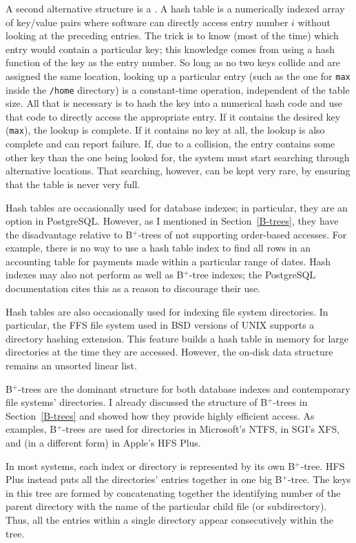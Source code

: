 A second alternative structure is a .  A hash table is a
numerically indexed array of key/value pairs where software can directly
access entry number $i$ without looking at the preceding entries.  The
trick is to know (most of the time) which entry would contain a
particular key; this knowledge comes from using a hash function of the key as the entry
number.  So long as no two keys collide and are assigned the same
location, looking up a particular entry (such as the one
for \verb|max| inside the
\verb|/home| directory) is a constant-time operation,
independent of the table size. All that is necessary is to hash the
key into a numerical hash code and use that code to directly access
the appropriate entry.  If it contains the desired key (\verb|max|),
the lookup is complete.  If it contains no key at all, the lookup is
also complete and can report failure.  If, due to a collision, the
entry contains some other key than the one being looked for, the
system must start searching through alternative locations.  That
searching, however, can be kept very rare, by ensuring that the table
is never very full.

Hash tables are occasionally used for database indexes; in particular,
they are an option in PostgreSQL.  However, as I mentioned in Section~\ref{B-trees},
they have the disadvantage relative to B${}^+$-trees of not supporting
order-based accesses.  For example, there is no way to use a hash
table index to find all rows in an accounting table for payments made
within a particular range of dates.  Hash indexes may also not perform
as well as B${}^+$-tree indexes; the PostgreSQL documentation cites this as
a reason to discourage their use.

Hash tables are also occasionally used for indexing file system
directories.  In particular, the FFS file system used in BSD versions
of UNIX supports a directory hashing extension.  This feature builds a
hash table in memory for large directories at the time they are
accessed.  However, the on-disk data structure remains an unsorted
linear list.

B${}^+$-trees are the dominant structure for both database indexes and
contemporary file systems' directories.  I already discussed the
structure of B${}^+$-trees in Section~\ref{B-trees} and showed how they
provide highly efficient access.  As examples, B${}^+$-trees are used for
directories in Microsoft's NTFS, in SGI's XFS, and (in a different
form) in Apple's HFS Plus.

In most systems, each index or directory is represented by its own
B${}^+$-tree.  HFS Plus instead puts all the directories' entries together
in one big B${}^+$-tree.  The keys in this tree are formed by concatenating
together the identifying number of the parent directory with the name
of the particular child file (or subdirectory).  Thus, all the entries
within a single directory appear consecutively within the tree.

